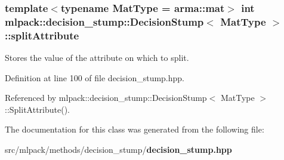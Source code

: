 \subsubsection[{split\-Attribute}]{\setlength{\rightskip}{0pt plus 5cm}template$<$typename Mat\-Type = arma\-::mat$>$ int {\bf mlpack\-::decision\-\_\-stump\-::\-Decision\-Stump}$<$ Mat\-Type $>$\-::split\-Attribute\hspace{0.3cm}{\ttfamily [private]}}\label{classmlpack_1_1decision__stump_1_1DecisionStump_a0d09065177121730c2c58b0a39b340b4}


Stores the value of the attribute on which to split. 



Definition at line 100 of file decision\-\_\-stump.\-hpp.



Referenced by mlpack\-::decision\-\_\-stump\-::\-Decision\-Stump$<$ Mat\-Type $>$\-::\-Split\-Attribute().



The documentation for this class was generated from the following file\-:\begin{DoxyCompactItemize}
\item 
src/mlpack/methods/decision\-\_\-stump/{\bf decision\-\_\-stump.\-hpp}\end{DoxyCompactItemize}
